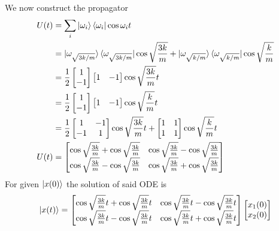 \documentclass[../main.tex]{subfiles}
\begin{document}
We now construct the propagator
\begin{align*}
	U(t) & =\sum_i \ket{\omega_i} \bra{\omega_i} \cos \omega_i t                                                                                                    \\
	     & =\ket{\omega_{\sqrt{3k/m}}}\bra{\omega_{\sqrt{3k/m}}}\cos \sqrt{\frac{3k}{m}}+\ket{\omega_{\sqrt{k/m}}}\bra{\omega_{\sqrt{k/m}}}\cos \sqrt{\frac{k }{m}} \\
	     & =\frac{1}{2}
	\begin{bmatrix}
		1 \\-1
	\end{bmatrix}
	\begin{bmatrix}
		1 & -1
	\end{bmatrix}
	\cos \sqrt{\frac{3k }{m }}t\\
    &=	\frac{1}{2}
	\begin{bmatrix}
		1 \\-1
	\end{bmatrix}
	\begin{bmatrix}
		1 & -1
	\end{bmatrix}
	\cos \sqrt{\frac{k }{m }}t\\
	     & =\frac{1}{2}
	\begin{bmatrix}
		1  & -1 \\
		-1 & 1  \\
	\end{bmatrix}
	\cos \sqrt{\frac{3k }{m }}t
	+
	\begin{bmatrix}
		1 & 1 \\
		1 & 1 \\
	\end{bmatrix}
	\cos \sqrt{\frac{k }{m }}t\\
	U(t) & =
	\begin{bmatrix}
		\cos \sqrt{\frac{3k }{m }}+\cos \sqrt{\frac{3k }{m }} & \cos \sqrt{\frac{3k }{m }}-\cos \sqrt{\frac{3k }{m }}\\
		\cos \sqrt{\frac{3k }{m }}-\cos \sqrt{\frac{3k }{m }} & \cos \sqrt{\frac{3k }{m }}+\cos \sqrt{\frac{3k }{m }}
	\end{bmatrix}
\end{align*}
For given $\ket{x(0)}$ the solution of said ODE is 
\begin{equation*}
    \ket{x(t)}=
    \begin{bmatrix}
		\cos \sqrt{\frac{3k }{m }}t+\cos \sqrt{\frac{3k }{m }}t & \cos \sqrt{\frac{3k }{m }}t-\cos \sqrt{\frac{3k }{m }}t\\
		\cos \sqrt{\frac{3k }{m }}t-\cos \sqrt{\frac{3k }{m }} t& \cos \sqrt{\frac{3k }{m }}t+\cos \sqrt{\frac{3k }{m }}t
	\end{bmatrix}
    \begin{bmatrix}
        x_1(0)\\
        x_2(0)\\
    \end{bmatrix}
\end{equation*}
\end{document}
